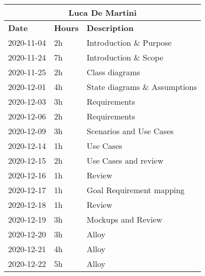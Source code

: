 
\begin{table}[H]
    \centering
    \begin{tabular}{|l|l|l|}
        \multicolumn{3}{c}{\textbf{Luca De Martini}}                   \\
        \hline
        \textbf{Date} & \textbf{Hours} & \textbf{Description}          \\\hline
        2020-11-04    & 2h             & Introduction \& Purpose       \\\hline
        2020-11-24    & 7h             & Introduction \& Scope         \\\hline
        2020-11-25    & 2h             & Class diagrams                \\\hline
        2020-12-01    & 4h             & State diagrams \& Assumptions \\\hline
        2020-12-03    & 3h             & Requirements                  \\\hline
        2020-12-06    & 2h             & Requirements                  \\\hline
        2020-12-09    & 3h             & Scenarios and Use Cases       \\\hline
        2020-12-14    & 1h             & Use Cases                     \\\hline
        2020-12-15    & 2h             & Use Cases and review          \\\hline
        2020-12-16    & 1h             & Review                        \\\hline
        2020-12-17    & 1h             & Goal Requirement mapping      \\\hline
        2020-12-18    & 1h             & Review                        \\\hline
        2020-12-19    & 3h             & Mockups and Review            \\\hline
        2020-12-20    & 3h             & Alloy                         \\\hline
        2020-12-21    & 4h             & Alloy                         \\\hline 
        2020-12-22    & 5h             & Alloy                         \\\hline 
    \end{tabular}
\end{table}
